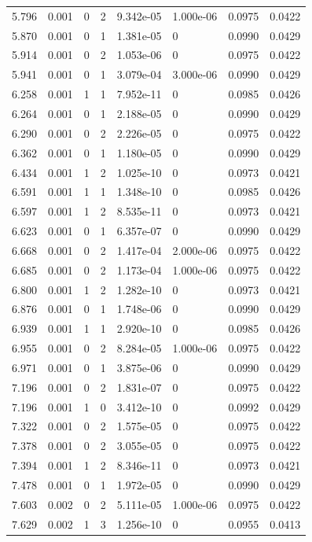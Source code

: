 \documentclass[preview]{standalone}
\begin{document}
{{{\begin{tabular}{L{1.2cm}C{1.2cm} C{0.3cm}C{0.5cm} C{1.4cm}C{1.4cm} C{1.4cm}C{1.4cm}}
  5.796  &  0.001  & 0     &  2 &  9.342e-05  & 1.000e-06  & 0.0975 &  0.0422   \\ 
  5.870  &  0.001  & 0     &  1 &  1.381e-05  & 0  & 0.0990 &  0.0429   \\ 
  5.914  &  0.001  & 0     &  2 &  1.053e-06  & 0  & 0.0975 &  0.0422   \\ 
  5.941  &  0.001  & 0     &  1 &  3.079e-04  & 3.000e-06  & 0.0990 &  0.0429   \\ 
  6.258  &  0.001  & 1     &  1 &  7.952e-11  & 0  & 0.0985 &  0.0426   \\ 
  6.264  &  0.001  & 0     &  1 &  2.188e-05  & 0  & 0.0990 &  0.0429   \\ 
  6.290  &  0.001  & 0     &  2 &  2.226e-05  & 0  & 0.0975 &  0.0422   \\ 
  6.362  &  0.001  & 0     &  1 &  1.180e-05  & 0  & 0.0990 &  0.0429   \\ 
  6.434  &  0.001  & 1     &  2 &  1.025e-10  & 0  & 0.0973 &  0.0421   \\ 
  6.591  &  0.001  & 1     &  1 &  1.348e-10  & 0  & 0.0985 &  0.0426   \\ 
  6.597  &  0.001  & 1     &  2 &  8.535e-11  & 0  & 0.0973 &  0.0421   \\ 
  6.623  &  0.001  & 0     &  1 &  6.357e-07  & 0  & 0.0990 &  0.0429   \\ 
  6.668  &  0.001  & 0     &  2 &  1.417e-04  & 2.000e-06  & 0.0975 &  0.0422   \\ 
  6.685  &  0.001  & 0     &  2 &  1.173e-04  & 1.000e-06  & 0.0975 &  0.0422   \\ 
  6.800  &  0.001  & 1     &  2 &  1.282e-10  & 0  & 0.0973 &  0.0421   \\ 
  6.876  &  0.001  & 0     &  1 &  1.748e-06  & 0  & 0.0990 &  0.0429   \\ 
  6.939  &  0.001  & 1     &  1 &  2.920e-10  & 0  & 0.0985 &  0.0426   \\ 
  6.955  &  0.001  & 0     &  2 &  8.284e-05  & 1.000e-06  & 0.0975 &  0.0422   \\ 
  6.971  &  0.001  & 0     &  1 &  3.875e-06  & 0  & 0.0990 &  0.0429   \\ 
  7.196  &  0.001  & 0     &  2 &  1.831e-07  & 0  & 0.0975 &  0.0422   \\ 
  7.196  &  0.001  & 1     &  0 &  3.412e-10  & 0  & 0.0992 &  0.0429   \\ 
  7.322  &  0.001  & 0     &  2 &  1.575e-05  & 0  & 0.0975 &  0.0422   \\ 
  7.378  &  0.001  & 0     &  2 &  3.055e-05  & 0  & 0.0975 &  0.0422   \\ 
  7.394  &  0.001  & 1     &  2 &  8.346e-11  & 0  & 0.0973 &  0.0421   \\ 
  7.478  &  0.001  & 0     &  1 &  1.972e-05  & 0  & 0.0990 &  0.0429   \\ 
  7.603  &  0.002  & 0     &  2 &  5.111e-05  & 1.000e-06  & 0.0975 &  0.0422   \\ 
  7.629  &  0.002  & 1     &  3 &  1.256e-10  & 0  & 0.0955 &  0.0413   \\ 
\hline 
\end{tabular} 

}}}
\end{document}
